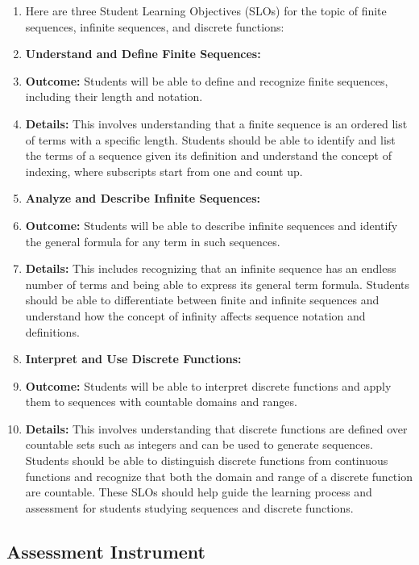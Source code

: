 \begin{enumerate}
    \item Here are three Student Learning Objectives (SLOs) for the topic of finite sequences, infinite sequences, and discrete functions:
    \item \textbf{Understand and Define Finite Sequences:}
    \item \textbf{Outcome:} Students will be able to define and recognize finite sequences, including their length and notation.
    \item \textbf{Details:} This involves understanding that a finite sequence is an ordered list of terms with a specific length. Students should be able to identify and list the terms of a sequence given its definition and understand the concept of indexing, where subscripts start from one and count up.
    \item \textbf{Analyze and Describe Infinite Sequences:}
    \item \textbf{Outcome:} Students will be able to describe infinite sequences and identify the general formula for any term in such sequences.
    \item \textbf{Details:} This includes recognizing that an infinite sequence has an endless number of terms and being able to express its general term formula. Students should be able to differentiate between finite and infinite sequences and understand how the concept of infinity affects sequence notation and definitions.
    \item \textbf{Interpret and Use Discrete Functions:}
    \item \textbf{Outcome:} Students will be able to interpret discrete functions and apply them to sequences with countable domains and ranges.
    \item \textbf{Details:} This involves understanding that discrete functions are defined over countable sets such as integers and can be used to generate sequences. Students should be able to distinguish discrete functions from continuous functions and recognize that both the domain and range of a discrete function are countable. These SLOs should help guide the learning process and assessment for students studying sequences and discrete functions.
\end{enumerate}

\subsection{Assessment Instrument}

